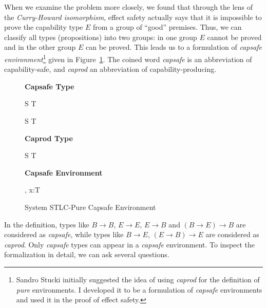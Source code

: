 When we examine the problem more closely, we found that through the
lens of the \emph{Curry-Howard isomorphism}, effect safety actually
says that it is impossible to prove the capability type $E$ from a
group of ``good'' premises. Thus, we can classify all types
(propositions) into two groups: in one group $E$ cannot be proved and
in the other group $E$ can be proved. This leads us to a formulation
of \emph{capsafe environment}\footnote{Sandro Stucki initially
  suggested the idea of using \emph{caprod} for the definition of
  \emph{pure} environments. I developed it to be a formulation of
  \emph{capsafe} environments and used it in the proof of effect
  safety.} given in Figure~\ref{fig:stlc-pure-capsafe-definition}. The
coined word \emph{capsafe} is an abbreviation of capability-safe, and
\emph{caprod} an abbreviation of capability-producing.

\begin{figure}[h]
\begin{framed}

\setlength{\columnseprule}{0.4pt}
\begin{multicols}{2}

\textbf{Capsafe Type}


{ S \to T \quad {} }

{ S \to T \quad {} }

\columnbreak

\textbf{Caprod Type}


{ S \to T \quad {} }

\textbf{Capsafe Environment}


{ \Gamma, \; x:T \quad {} }


\end{multicols}
\end{framed}

\caption{System STLC-Pure Capsafe Environment}
\label{fig:stlc-pure-capsafe-definition}
\end{figure}

In the definition, types like $B \to B$, $E \to E$, $E \to B$ and
$(B \to E) \to B$ are considered as \emph{capsafe}, while types like
$B \to E$, $(E \to B) \to E$ are considered as \emph{caprod}. Only
\emph{capsafe} types can appear in a \emph{capsafe} environment. To
inspect the formalization in detail, we can ask several questions.

